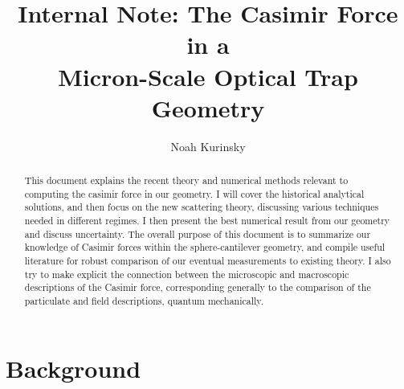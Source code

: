 \documentclass[11pt,traditabstract]{article}
\title{\vspace{-0.5in}Internal Note: The Casimir Force in a \\ Micron-Scale Optical Trap Geometry}
\author{Noah Kurinsky}
\begin{document}
\maketitle

\begin{abstract}
This document explains the recent theory and numerical methods relevant to computing the casimir force in our geometry. I will cover the historical analytical solutions, and then focus on the new scattering theory, discussing various techniques needed in different regimes. I then present the best numerical result from our geometry and discuss uncertainty. The overall purpose of this document is to summarize our knowledge of Casimir forces within the sphere-cantilever geometry, and compile useful literature for robust comparison of our eventual measurements to existing theory. I also try to make explicit the connection between the microscopic and macroscopic descriptions of the Casimir force, corresponding generally to the comparison of the particulate and field descriptions, quantum mechanically.
\end{abstract}

\section{Background}
\end{document}
